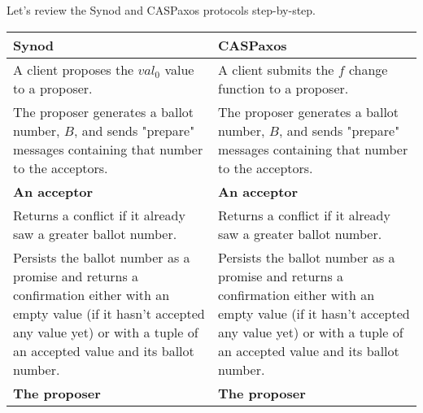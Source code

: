 \documentclass[a4paper,USenglish]{lipics-v2018}
\theoremstyle{definition}
\begin{document}
    Let's review the Synod and CASPaxos protocols step-by-step.

    \begin{center}
        \begin{longtable}{p{15em}|p{15em}} 
            \hline
            {\bf Synod}
            &
            {\bf CASPaxos} \\ 
            \hline
            \endfirsthead
        
            \endhead
            \endfoot
            \endlastfoot
          
            A client proposes the $val_0$ value to a proposer.
            &
            A client submits the $f$ change function to a proposer. \\
          
            \hline
            
            The proposer generates a ballot number, $B$, and sends "prepare" messages containing   that number to the acceptors.
            &
            The proposer generates a ballot number, $B$, and sends "prepare" messages containing   that number to the acceptors. \\
            
            \hline
            
            {\bf An acceptor}
            &
            {\bf An acceptor} \\[6pt]
            
            
            Returns a conflict if it already saw a greater ballot number.
            &
            Returns a conflict if it already saw a greater ballot number.
            \\[6pt]
            
            
            Persists the ballot number as a promise and returns a confirmation either with an   empty value (if it hasn't accepted any value yet) or with a tuple of an accepted   value and its ballot number.
            &
            Persists the ballot number as a promise and returns a confirmation either with an   empty value (if it hasn't accepted any value yet) or with a tuple of an accepted   value and its ballot number.
            \\[6pt]
            
            \hline
            
            {\bf The proposer}
            &
            {\bf The proposer} \\[6pt]
            

\end{longtable}
\end{center}
\end{document}
